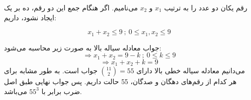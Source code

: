 \p
	رقم یکان دو عدد را به ترتیب 
	$x_1$
	و
	$x_2$
	می‌نامیم.
	اگر هنگام جمع این دو رقم، ده بر یک ایجاد نشود، داریم:
	
	$$x_1 + x_2 \leq 9 \: ; \: 0 \leq x_1 , x_2 \leq 9$$
	
	 جواب معادله سیاله بالا به صورت زیر محاسبه می‌شود:
	 $$\Rightarrow x_1 + x_2 = 9 - k \: ; \: 0 \leq k \leq 9 $$
	$$ \Rightarrow x_1 + x_2 + k = 9$$
	می‌دانیم معادله سیاله خطی بالا دارای
    $\binom{11}{2} = 55$
	جواب است.
    به طور مشابه 
	برای هر کدام از رقم‌های دهگان و صدگان، 55 حالت داریم. پس جواب نهایی طبق اصل ضرب برابر با
	$55^3$
	می‌باشد.
